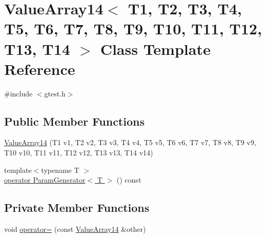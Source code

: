 \hypertarget{classtesting_1_1internal_1_1ValueArray14}{\section{\-Value\-Array14$<$ \-T1, \-T2, \-T3, \-T4, \-T5, \-T6, \-T7, \-T8, \-T9, \-T10, \-T11, \-T12, \-T13, \-T14 $>$ \-Class \-Template \-Reference}
\label{d8/d9a/classtesting_1_1internal_1_1ValueArray14}
}


{\ttfamily \#include $<$gtest.\-h$>$}

\subsection*{\-Public \-Member \-Functions}
\begin{DoxyCompactItemize}
\item 
\hyperlink{classtesting_1_1internal_1_1ValueArray14_a9fa3f500bac3beb42ee2cc5b07fea25f}{\-Value\-Array14} (\-T1 v1, \-T2 v2, \-T3 v3, \-T4 v4, \-T5 v5, \-T6 v6, \-T7 v7, \-T8 v8, \-T9 v9, \-T10 v10, \-T11 v11, \-T12 v12, \-T13 v13, \-T14 v14)
\item 
{\footnotesize template$<$typename T $>$ }\\\hyperlink{classtesting_1_1internal_1_1ValueArray14_a08ef46fa12c9dd8ef6fc630baeea89b7}{operator Param\-Generator$<$ T $>$} () const 
\end{DoxyCompactItemize}
\subsection*{\-Private \-Member \-Functions}
\begin{DoxyCompactItemize}
\item 
void \hyperlink{classtesting_1_1internal_1_1ValueArray14_a1d9d73c2afe0f1ec727bdd9d77368d40}{operator=} (const \hyperlink{classtesting_1_1internal_1_1ValueArray14}{\-Value\-Array14} \&other)
\end{DoxyCompactItemize}
